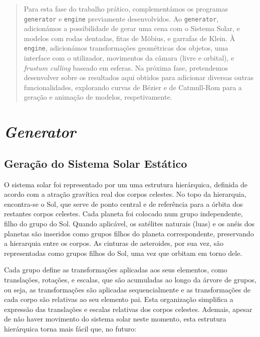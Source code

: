 \documentclass[12pt, a4paper]{article}
\begin{document}
\pagebreak

\begin{abstract}
    Para esta fase do trabalho prático, complementámos os programas \texttt{generator} e
    \texttt{engine} previamente desenvolvidos. Ao \texttt{generator}, adicionámos a possibilidade
    de gerar uma cena com o Sistema Solar, e modelos com rodas dentadas, fitas de Möbius, e garrafas
    de Klein. À \texttt{engine}, adicionámos transformações geométricas dos objetos, uma interface
    com o utilizador, movimentos da câmara (livre e orbital), e \emph{frustum culling} baseado em
    esferas. Na próxima fase, pretendemos desenvolver sobre os resultados aqui obtidos para
    adicionar diversas outras funcionalidades, explorando curvas de Bézier e de Catmull-Rom para a
    geração e animação de modelos, respetivamente.
\end{abstract}

\section{\emph{Generator}}

\subsection{Geração do Sistema Solar Estático}

O sistema solar foi representado por um uma estrutura hierárquica, definida de acordo com a atração
gravítica real dos corpos celestes. No topo da hierarquia, encontra-se o Sol, que serve de ponto
central e de referência para a órbita dos restantes corpos celestes. Cada planeta foi colocado num
grupo independente, filho do grupo do Sol. Quando aplicável, os satélites naturais (luas) e os anéis
dos planetas são inseridos como grupos filhos do planeta correspondente, preservando a hierarquia
entre os corpos. As cinturas de asteroides, por sua vez, são representadas como grupos filhos do
Sol, uma vez que orbitam em torno dele.

Cada grupo define as transformações aplicadas aos seus elementos, como translações, rotações, e
escalas, que são acumuladas ao longo da árvore de grupos, ou seja, as transformações são aplicadas
sequencialmente e as transformações de cada corpo são relativas ao seu elemento pai. Esta
organização simplifica a expressão das translações e escalas relativas dos corpos celestes. Ademais,
apesar de não haver movimento do sistema solar neste momento, esta estrutura hierárquica torna mais
fácil que, no futuro:
\end{document}
